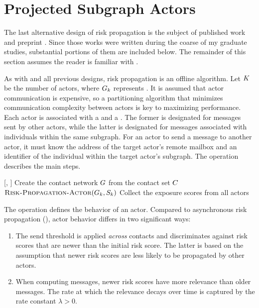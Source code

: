 \section{Projected Subgraph Actors}\label{sec:projected-subgraphs}

The last alternative design of risk propagation is the subject of published work \citep{Tatton2022b} and preprint \citep{Tatton2022a}. Since those works were written during the coarse of my graduate studies, substantial portions of them are included below. The remainder of this section assumes the reader is familiar with .

As with \cRiskPropagation{} and all previous designs, risk propagation is an offline algorithm. Let $K$ be the number of actors, where $G_k$ represents . It is assumed that actor communication is expensive, so a partitioning algorithm \citep{Buluc2016} that minimizes communication complexity between actors is key to maximizing performance. Each actor is associated with a  and a . The former is designated for messages sent by other actors, while the latter is designated for messages associated with individuals within the same subgraph. For an actor to send a message to another actor, it must know the address of the target actor's remote mailbox and an identifier of the individual within the target actor's subgraph. The \cRiskPropagationMain{} operation describes the main steps.

\begin{function}{\nRiskPropagationMain}[\vScores, \vContacts]
  \State Create the contact network $G$ from the contact set $C$
    \State $\cRiskPropagationActor[\vGraph_k, \vScores_k]$
  \EndFor
  \State Collect the exposure scores from all actors
\end{function}

The \cRiskPropagationActor{} operation defines the behavior of an actor. Compared to asynchronous risk propagation (), actor behavior differs in two significant ways:
\begin{enumerate}
  \item The send threshold is applied \emph{across} contacts and discriminates against risk scores that are newer than the initial risk score. The latter is based on the assumption that newer risk scores are less likely to be propagated by other actors.
  \item When computing messages, newer risk scores have more relevance than older messages. The rate at which the relevance decays over time is captured by the rate constant $\lambda > 0$.
\end{enumerate}

